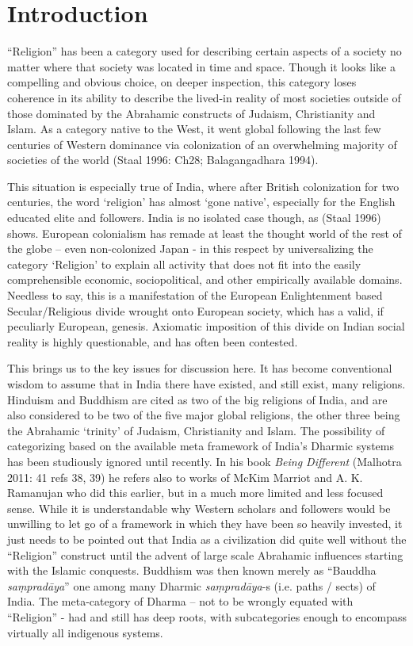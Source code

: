 \section*{Introduction}

“Religion” has been a category used for describing certain aspects of a society no matter where that society was located in time and space. Though it looks like a compelling and obvious choice, on deeper inspection, this category loses coherence in its ability to describe the lived-in reality of most societies outside of those dominated by the Abrahamic constructs of Judaism, Christianity and Islam. As a category native to the West, it went global following the last few centuries of Western dominance via colonization of an overwhelming majority of societies of the world (Staal 1996: Ch28; Balagangadhara 1994).

This situation is especially true of India, where after British colonization for two centuries, the word ‘religion’ has almost ‘gone native’, especially for the English educated elite and followers. India is no isolated case though, as (Staal 1996) shows. European colonialism has remade at least the thought world of the rest of the globe – even non-colonized Japan - in this respect by universalizing the category ‘Religion’ to explain all activity that does not fit into the easily comprehensible economic, sociopolitical, and other empirically available domains. Needless to say, this is a manifestation of the European Enlightenment based Secular/Religious divide wrought onto European society, which has a valid, if peculiarly European, genesis. Axiomatic imposition of this divide on Indian social reality is highly questionable, and has often been contested.

This brings us to the key issues for discussion here. It has become conventional wisdom to assume that in India there have existed, and still exist, many religions. Hinduism and Buddhism are cited as two of the big religions of India, and are also considered to be two of the five major global religions, the other three being the Abrahamic ‘trinity’ of Judaism, Christianity and Islam. The possibility of categorizing based on the available meta framework of India’s Dharmic systems has been studiously ignored until recently. In his book \textit{Being Different} (Malhotra 2011: 41 refs 38, 39) he refers also to works of McKim Marriot and A. K. Ramanujan who did this earlier, but in a much more limited and less focused sense. While it is understandable why Western scholars and followers would be unwilling to let go of a framework in which they have been so heavily invested, it just needs to be pointed out that India as a civilization did quite well without the “Religion” construct until the advent of large scale Abrahamic influences starting with the Islamic conquests. Buddhism was then known merely as “Bauddha \textit{saṃpradāya}” one among many Dharmic \textit{saṃpradāya}-s (i.e. paths / sects) of India. The meta-category of Dharma – not to be wrongly equated with “Religion” - had and still has deep roots, with subcategories enough to encompass virtually all indigenous systems.

